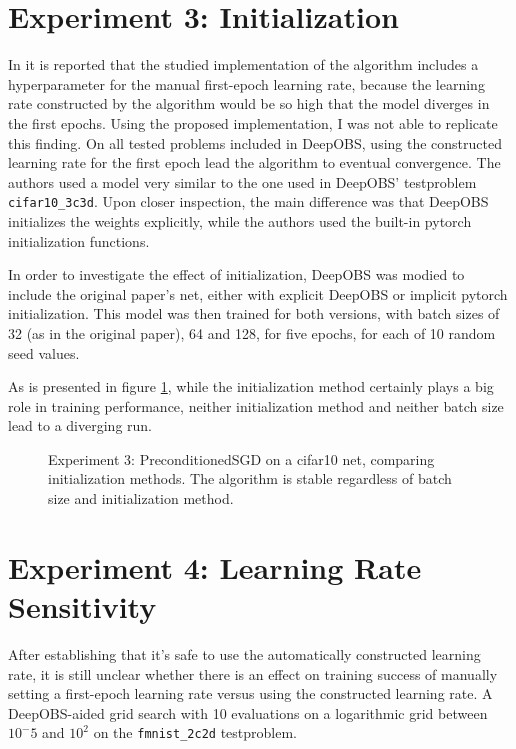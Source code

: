 \documentclass[twoside,12pt,a4paper]{report}
\begin{document}
\section{Experiment 3: Initialization}
In \cite{roos2019active} it is reported that the studied implementation of the algorithm includes a hyperparameter for the manual first-epoch learning rate, because the learning rate constructed by the algorithm would be so high that the model diverges in the first epochs. Using the proposed implementation, I was not able to replicate this finding. On all tested problems included in DeepOBS, using the constructed learning rate for the first epoch lead the algorithm to eventual convergence. The authors used a model very similar to the one used in DeepOBS' testproblem \verb|cifar10_3c3d|. Upon closer inspection, the main difference was that DeepOBS initializes the weights explicitly, while the authors used the built-in pytorch initialization functions.

In order to investigate the effect of initialization, DeepOBS was modied to include the original paper's net, either with explicit DeepOBS or implicit pytorch initialization. This model was then trained for both versions, with batch sizes of 32 (as in the original paper), 64 and 128, for five epochs, for each of 10 random seed values.

As is presented in figure \ref{fig:exp_init}, while the initialization method certainly plays a big role in training performance, neither initialization method and neither batch size lead to a diverging run.
\begin{figure}
	\centering \hspace{-1,5cm}
	
	\caption{Experiment 3: PreconditionedSGD on a cifar10 net, comparing initialization methods. The algorithm is stable regardless of batch size and initialization method.}
	\label{fig:exp_init}
	
\end{figure}


\section{Experiment 4: Learning Rate Sensitivity}

After establishing that it's safe to use the automatically constructed learning rate, it is still unclear whether there is an effect on training success of manually setting a first-epoch learning rate versus using the constructed learning rate.
A DeepOBS-aided grid search with 10 evaluations on a logarithmic grid between $10^-5$ and $10^2$ on the \verb|fmnist_2c2d| testproblem.
\end{document}
